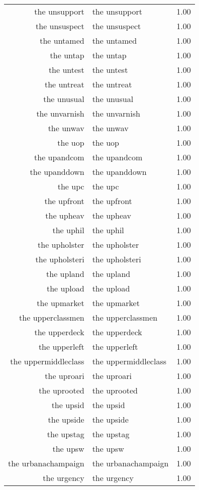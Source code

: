 \begin{table}[ht]
\begin{tabular}{rlr}
  the unsupport & the unsupport & 1.00 \\ 
  the unsuspect & the unsuspect & 1.00 \\ 
  the untamed & the untamed & 1.00 \\ 
  the untap & the untap & 1.00 \\ 
  the untest & the untest & 1.00 \\ 
  the untreat & the untreat & 1.00 \\ 
  the unusual & the unusual & 1.00 \\ 
  the unvarnish & the unvarnish & 1.00 \\ 
  the unwav & the unwav & 1.00 \\ 
  the uop & the uop & 1.00 \\ 
  the upandcom & the upandcom & 1.00 \\ 
  the upanddown & the upanddown & 1.00 \\ 
  the upc & the upc & 1.00 \\ 
  the upfront & the upfront & 1.00 \\ 
  the upheav & the upheav & 1.00 \\ 
  the uphil & the uphil & 1.00 \\ 
  the upholster & the upholster & 1.00 \\ 
  the upholsteri & the upholsteri & 1.00 \\ 
  the upland & the upland & 1.00 \\ 
  the upload & the upload & 1.00 \\ 
  the upmarket & the upmarket & 1.00 \\ 
  the upperclassmen & the upperclassmen & 1.00 \\ 
  the upperdeck & the upperdeck & 1.00 \\ 
  the upperleft & the upperleft & 1.00 \\ 
  the uppermiddleclass & the uppermiddleclass & 1.00 \\ 
  the uproari & the uproari & 1.00 \\ 
  the uprooted & the uprooted & 1.00 \\ 
  the upsid & the upsid & 1.00 \\ 
  the upside & the upside & 1.00 \\ 
  the upstag & the upstag & 1.00 \\ 
  the upsw & the upsw & 1.00 \\ 
  the urbanachampaign & the urbanachampaign & 1.00 \\ 
  the urgency & the urgency & 1.00 \\ 

\end{tabular}
\end{table}
